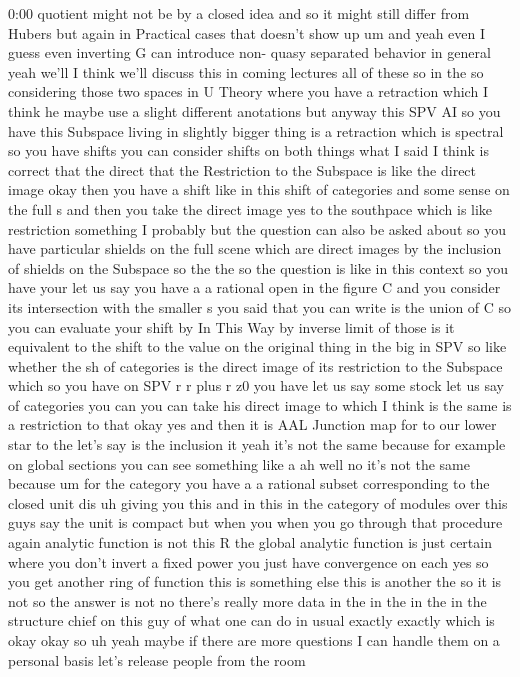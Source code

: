 \begin{unfinished}{0:00}
quotient  might  not  be  by  a  closed  idea
and  so  it  might  still  differ  from  Hubers
but  again  in  Practical  cases  that
doesn't  show
up  um  and  yeah  even  I  guess  even
inverting  G  can  introduce  non-  quasy
separated  behavior  in  general  yeah  we'll
I  think  we'll  discuss  this  in  coming
lectures  all  of  these  so  in  the  so
considering  those  two  spaces  in  U  Theory
where  you  have  a  retraction  which  I
think  he  maybe  use  a  slight  different
anotations  but  anyway  this  SPV  AI  so  you
have  this
Subspace  living  in  slightly  bigger  thing
is  a  retraction  which  is  spectral  so  you
have  shifts  you  can  consider  shifts  on
both  things  what  I  said  I  think  is
correct  that  the  direct  that  the
Restriction  to  the  Subspace  is  like  the
direct  image  okay  then  you  have  a  shift
like  in  this  shift  of  categories  and
some  sense  on  the  full  s  and  then  you
take  the  direct  image  yes  to  the
southpace  which  is  like  restriction
something  I  probably  but  the  question
can  also  be  asked
about  so  you  have  particular  shields  on
the  full  scene  which  are  direct  images
by  the  inclusion  of  shields  on  the
Subspace  so  the  the  so  the  question  is
like  in  this  context  so  you  have  your
let  us  say  you  have  a  a  rational  open  in
the  figure  C  and  you  consider  its
intersection  with  the  smaller  s  you  said
that  you  can  write  is  the  union  of  C  so
you  can  evaluate  your  shift  by  In  This
Way  by  inverse  limit  of  those  is  it
equivalent  to  the  shift  to  the  value  on
the  original  thing  in  the  big  in
SPV  so  like  whether  the  sh  of  categories
is  the  direct  image  of  its  restriction
to  the  Subspace  which
so  you  have  on  SPV  r  r  plus  r  z0  you
have  let  us  say  some  stock  let  us  say  of
categories  you  can  you  can  take  his
direct  image  to  which  I  think  is  the
same  is  a  restriction  to  that  okay  yes
and  then  it  is  AAL  Junction  map  for  to
our  lower  star  to  the  let's  say  is  the
inclusion
it  yeah  it's  not  the  same  because  for
example  on  global  sections  you  can  see
something  like  a  ah  well  no  it's  not  the
same  because  um  for  the  category  you
have  a  a  rational  subset  corresponding
to  the  closed  unit  dis  uh  giving  you
this  and  in  this  in  the  category  of
modules  over  this  guys  say  the  unit
is  compact  but  when  you  when  you  go
through  that  procedure  again  analytic
function  is  not  this  R  the  global
analytic  function  is  just  certain  where
you  don't  invert  a  fixed  power  you  just
have  convergence  on  each  yes  so  you  get
another  ring  of  function  this  is
something  else  this  is  another  the  so  it
is  not  so  the  answer  is  not  no  there's
really  more  data  in  the  in  the  in  the  in
the  structure  chief  on  this  guy  of  what
one  can  do  in  usual
exactly  exactly  which
is
okay  okay  so  uh  yeah  maybe  if  there  are
more  questions  I  can  handle  them  on  a
personal  basis  let's  release  people  from
the
room
\end{unfinished}